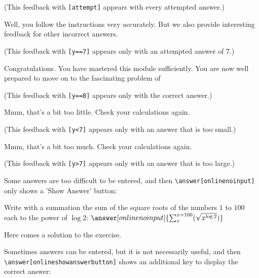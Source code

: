 \documentclass{ximera}
\begin{document}
\begin{exercise}
\begin{question}
\begin{feedback}[attempt]
            (This feedback with \verb|[attempt]| appears with every attempted answer.)   
           \end{feedback}

          \begin{feedback}[y==7]
            Well, you follow the instructions very accurately. But we also provide interesting feedback for other incorrect answers.

            (This feedback with \verb|[y==7]| appears only with an attempted answer of $7$.)   

          \end{feedback}
          \begin{feedback}[y==8]
          Congratulations. You have mastered this module sufficiently. You are now well prepared to move on to the fascinating problem of 

          (This feedback with \verb|[y==8]| appears only with the correct answer.)   

          \end{feedback}
          \begin{feedback}[y<7]
              Mmm, that's a bit too little. Check your calculations again.

              (This feedback with \verb|[y<7]| appears only with an answer that is too small.)   
            \end{feedback}
          \begin{feedback}[y>8]
              Mmm, that's a bit too much. Check your calculations again.

              (This feedback with \verb|[y>7]| appears only with an answer that is too large.)   

           \end{feedback}
       \end{question}

	\begin{question}
		Some answers are too difficult to be entered, and then \verb|\answer[onlinenoinput]| only shows a 'Show Answer' button:

		Write with a summation the sum of the square roots of the numbers $1$ to $100$ each to the power of $\log 2$: $\answer[onlinenoinput]{\sum_x^{x=100}(\sqrt{x^{\log 2}})}$

		\begin{solution}
			Here comes a solution to the exercise.
		\end{solution}
	\end{question}
	\begin{question}\label{itm:showCase:laatste_oefening}
		Sometimes answers can be entered, but it is not necessarily useful, and then \verb|\answer[onlineshowanswerbutton]| shows an additional key to display the correct answer:


\end{question}
\end{exercise}
\end{document}
